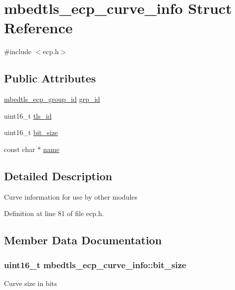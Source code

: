 \hypertarget{structmbedtls__ecp__curve__info}{\section{mbedtls\-\_\-ecp\-\_\-curve\-\_\-info Struct Reference}
\label{structmbedtls__ecp__curve__info}
}


{\ttfamily \#include $<$ecp.\-h$>$}

\subsection*{Public Attributes}
\begin{DoxyCompactItemize}
\item 
\hyperlink{ecp_8h_af79e530ea8f8416480f805baa20b1a2d}{mbedtls\-\_\-ecp\-\_\-group\-\_\-id} \hyperlink{structmbedtls__ecp__curve__info_a1fdb81fb58ed6039b5c9fe1a3c82852b}{grp\-\_\-id}
\item 
uint16\-\_\-t \hyperlink{structmbedtls__ecp__curve__info_ac2754d3ed70b7cc54ba3567372763551}{tls\-\_\-id}
\item 
uint16\-\_\-t \hyperlink{structmbedtls__ecp__curve__info_a893162d86716513661ccb05b4a450af1}{bit\-\_\-size}
\item 
const char $\ast$ \hyperlink{structmbedtls__ecp__curve__info_a123ba197ecf3a5573e28030393f7b1dd}{name}
\end{DoxyCompactItemize}


\subsection{Detailed Description}
Curve information for use by other modules 

Definition at line 81 of file ecp.\-h.



\subsection{Member Data Documentation}
\hypertarget{structmbedtls__ecp__curve__info_a893162d86716513661ccb05b4a450af1}{
\subsubsection[{bit\-\_\-size}]{\setlength{\rightskip}{0pt plus 5cm}uint16\-\_\-t mbedtls\-\_\-ecp\-\_\-curve\-\_\-info\-::bit\-\_\-size}}\label{structmbedtls__ecp__curve__info_a893162d86716513661ccb05b4a450af1}
Curve size in bits 


